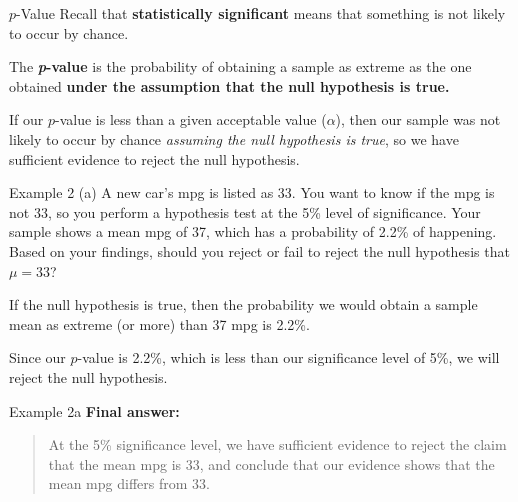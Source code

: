 \documentclass[t]{beamer}
\begin{document}
\begin{frame}{$p$-Value}
Recall that {\color{blue}\textbf{statistically significant}} means that something is not likely to occur by chance. \newline\\	\pause

\begin{tcolorbox}[colframe=green!20!black, colback = green!30!white,title=\textbf{\textit{p}-Value}]
The \textbf{\textit{p}-value} is the probability of obtaining a sample as extreme as the one obtained \textbf{under the assumption that the null hypothesis is true.}
\end{tcolorbox}
\bigskip \pause

If our $p$-value is less than a given acceptable value ($\alpha$), then our sample was not likely to occur by chance \emph{assuming the null hypothesis is true}, \pause so we have sufficient evidence to reject the null hypothesis.
\end{frame}

\begin{frame}{Example 2}
(a) \quad A new car's mpg is listed as 33. You want to know if the mpg is not 33, so you perform a hypothesis test at the 5\% level of significance. Your sample shows a mean mpg of 37, which has a probability of 2.2\% of happening.	\newline\\ 
Based on your findings, should you reject or fail to reject the null hypothesis that $\mu = 33$?	\newline\\	\pause

If the null hypothesis is true, then the probability we would obtain a sample mean as extreme (or more) than 37 mpg is 2.2\%. \newline\\	\pause

Since our $p$-value is 2.2\%, which is less than our significance level of 5\%, we will reject the null hypothesis.
\end{frame}

\begin{frame}{Example 2a}
\textbf{Final answer:}
\begin{quote}
At the 5\% significance level, we have sufficient evidence to reject the claim that the mean mpg is 33, and conclude that our evidence shows that the mean mpg differs from 33.
\end{quote}
\end{frame}
\end{document}
